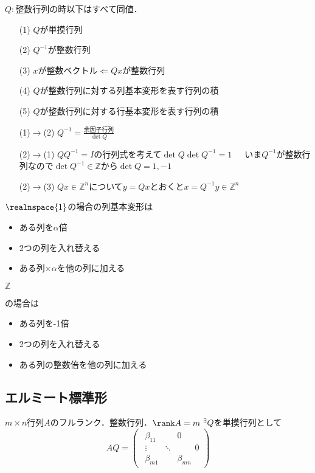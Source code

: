 $Q:$整数行列の時以下はすべて同値．
\begin{itemize}
  \item[(1)]$Q$が単摸行列\\
  \item[(2)]$Q^{-1}$が整数行列\\
  \item[(3)]$x$が整数ベクトル$\Leftarrow Qx$が整数行列\\
  \item[(4)]$Q$が整数行列に対する列基本変形を表す行列の積\\
  \item[(5)]$Q$が整数行列に対する行基本変形を表す行列の積
\end{itemize}
\begin{itemize}
  \item[(1)$\to$(2)]$Q^{-1}=\displaystyle\frac{余因子行列}{\det Q}$\\
  \item[(2)$\to$(1)]$QQ^{-1}=I$の行列式を考えて$\det Q\det Q^{-1}=1$\ \ \ いま$Q^{-1}$が整数行列なので$\det Q^{-1}\in\mathbb{Z}$から$\det Q=1,-1$\\
  \item[(2)$\to$(3)]$Qx\in{\mathbb{Z}}^n $について$y=Qx$とおくと$x=Q^{-1}y\in{\mathbb{Z}}^n$
\end{itemize}

$\realnspace{1}$の場合の列基本変形は
\begin{itemize}
  \item ある列を$\alpha$倍
  \item 2つの列を入れ替える
  \item ある列$\times\alpha$を他の列に加える
\end{itemize}

\hypertarget{basictrans}{$\mathbb{Z}$}の場合は
\begin{itemize}
  \item ある列を-1倍
  \item 2つの列を入れ替える
  \item ある列の整数倍を他の列に加える
\end{itemize}
\subsection{エルミート標準形}
$m\times n$行列$A$のフルランク．整数行列．$\rank A=m$ ${}^{\exists}Q$を単摸行列として
\begin{equation*}
  AQ=
  \begin{pmatrix}
    \begin{array}{ccc|}
      {\beta}_{11}&&0\\
      \vdots&\ddots&\\
      {\beta}_{m1}&&{\beta}_{mn}
    \end{array}0
  \end{pmatrix}
\end{equation*}

